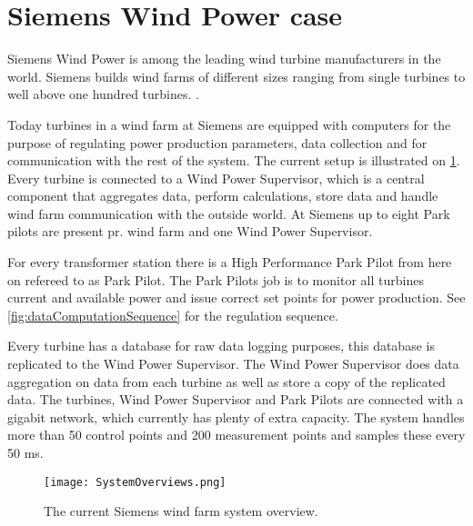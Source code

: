 \section{Siemens Wind Power case}


\label{sec:SiemensCase}
Siemens Wind Power is among the leading wind turbine manufacturers in the world. Siemens builds wind farms of different sizes ranging from single turbines to well above one hundred turbines. \cite{simensOffShoreProjects, simensOnShoreProjects}.

Today turbines in a wind farm at Siemens are equipped with computers for the purpose of regulating power production parameters, data collection and for communication with the rest of the system. The current setup is illustrated on \cref{fig:currentSiemensSetup}. Every turbine is connected to a Wind Power Supervisor, which is a central component that aggregates data, perform calculations, store data and handle wind farm communication with the outside world. At Siemens up to eight Park pilots are present pr. wind farm and one Wind Power Supervisor.

For every transformer station there is a High Performance Park Pilot from here on refereed to as Park Pilot. The Park Pilots job is to monitor all turbines current and available power and issue correct set points for power production. See \cref{fig:dataComputationSequence} for the regulation sequence.

Every turbine has a database for raw data logging purposes, this database is replicated to the Wind Power Supervisor.
The Wind Power Supervisor does 
data aggregation on data from each turbine as well as store a copy of the replicated data.
The turbines, Wind Power Supervisor and Park Pilots are connected with a gigabit network, which currently has plenty of extra capacity.
The system handles more than 50 control points and 200 measurement points and samples these every 50 ms.


\begin{figure}
	\centering
	\texttt{[image: SystemOverviews.png]} 
	\caption[The current Siemens wind farm system overview]{
		\label{fig:currentSiemensSetup} 
		\footnotesize{%
			The current Siemens wind farm system overview.
		}
	}
\end{figure}


